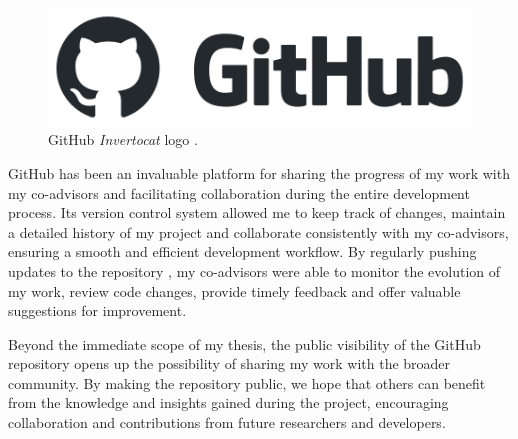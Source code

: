 \begin{figure}[h]
	\centering
	\includegraphics[width=0.7\linewidth]{images/Technologies/GitHub_logo.png}
	\caption{GitHub \textit{Invertocat} logo \cite{GitHubLogo}.}
	\label{fig:GitHub_logo}
\end{figure}

GitHub has been an invaluable platform for sharing the progress of my work with my co-advisors and facilitating collaboration during the entire development process. 
Its version control system allowed me to keep track of changes, maintain a detailed history of my project and collaborate consistently with my co-advisors, ensuring a smooth and efficient development workflow. 
By regularly pushing updates to the repository \cite{MasterThesisRepo}, my co-advisors were able to monitor the evolution of my work, review code changes, provide timely feedback and offer valuable suggestions for improvement.

Beyond the immediate scope of my thesis, the public visibility of the GitHub repository opens up the possibility of sharing my work with the broader community. 
By making the repository public, we hope that others can benefit from the knowledge and insights gained during the project, encouraging collaboration and contributions from future researchers and developers.

